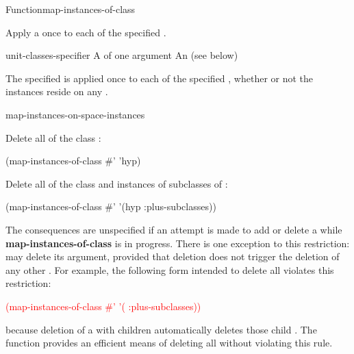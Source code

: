 \documentclass[10pt,twoside,english,pdftex]{article}
\begin{document}
\begin{functiondoc}{Function}{map-instances-of-class}%
{}
%
%

\fnsyntax

\fnpurpose Apply a  once to each  of the
specified . 

\fnpackage {}

\fnmodule {}

\fnargs
\begin{args}{unit-classes-specifier}
\arg[function] A  of one argument
 An 
(see below)
\end{args}

\fndsyntax
\unitclassesspec
\subclassingspec

\fndescription The specified  is applied once to each
 of the specified , whether
or not the instances reside on any .

\begin{alsos}{map-instances-on-space-instances}
\end{alsos}

\fnexamples
Delete all  of the class :
\begin{example}
  (map-instances-of-class #' 'hyp)
\end{example} 

Delete all  of the class  and
instances of subclasses of :
\begin{example}
  (map-instances-of-class #' '(hyp :plus-subclasses))
\end{example} 

\fnnotes
{}%
%
The consequences are unspecified if an attempt is made to add or delete a
 while \textbf{map-instances-of-class} is in progress.
There is one exception to this restriction:  may delete its
 argument, provided that deletion does not trigger the
deletion of any other .  For example, the following
form intended to delete all  violates this restriction:
\begin{example}
   \textcolor{red}{(map-instances-of-class 
     #' '( :plus-subclasses))}
\end{example}
because deletion of a  with children automatically
deletes those child .  The function
\textbf{} provides an efficient means of
deleting all  without violating this rule.


\end{functiondoc}
\end{document}
